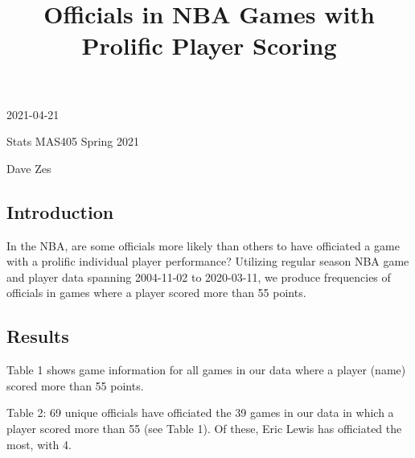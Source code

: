 \documentclass[
  12pt,
]{article}
\title{Officials in NBA Games with Prolific Player Scoring}
\author{}
\date{\vspace{-2.5em}}
\begin{document}
\maketitle

2021-04-21

Stats MAS405 Spring 2021

Dave Zes

\hypertarget{introduction}{%
\subsection{Introduction}\label{introduction}}

In the NBA, are some officials more likely than others to have
officiated a game with a prolific individual player performance?
Utilizing regular season NBA game and player data spanning 2004-11-02 to
2020-03-11, we produce frequencies of officials in games where a player
scored more than 55 points.

\hypertarget{results}{%
\subsection{Results}\label{results}}

Table 1 shows game information for all games in our data where a player
(name) scored more than 55 points.



\newpage



Table 2: 69 unique officials have officiated the 39 games in our data in
which a player scored more than 55 (see Table 1). Of these, Eric Lewis
has officiated the most, with 4.


\end{document}
